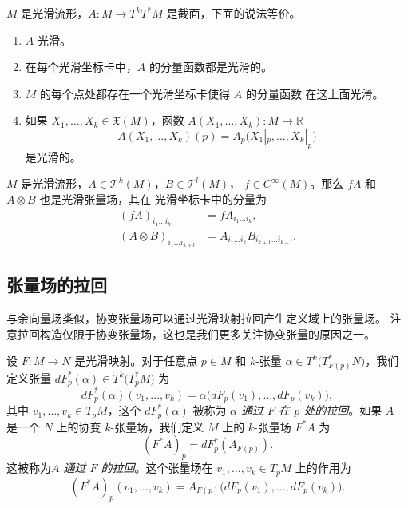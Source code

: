 \documentclass[fontset=none]{Notes}
\begin{document}
\begin{proposition}[张量场的光滑性判别]
  $M$ 是光滑流形，$A:M\to T^kT^*M$ 是截面，下面的说法等价。
  \begin{enumerate}
    \item $A$ 光滑。
    \item 在每个光滑坐标卡中，$A$ 的分量函数都是光滑的。
    \item $M$ 的每个点处都存在一个光滑坐标卡使得 $A$ 的分量函数
    在这上面光滑。
    \item 如果 $X_1,\dots,X_k\in \mathfrak{X}(M)$，函数 $A(X_1,\dots,X_k):M\to \mathbb{R}$
    \[
      A(X_1,\dots,X_k)(p)=A_p\bigl(X_1|_p,\dots,X_k|_p\bigr)
    \]
    是光滑的。
  \end{enumerate}
\end{proposition}

\begin{proposition}
  $M$ 是光滑流形，$A\in \mathcal{T}^k(M)$，$B\in \mathcal{T}^l(M)$，
  $f\in C^\infty(M)$。那么 $fA$ 和 $A\otimes B$ 也是光滑张量场，其在
  光滑坐标卡中的分量为
  \begin{align*}
    (fA)_{i_1\dots i_k}&= fA_{i_1\dots i_k},\\
    (A\otimes B)_{i_1\dots i_{k+l}}&=A_{i_1\dots i_k}B_{i_{k+1}\dots i_{k+l}}.
  \end{align*}
\end{proposition}

\subsection{张量场的拉回}

与余向量场类似，协变张量场可以通过光滑映射拉回产生定义域上的张量场。
注意拉回构造仅限于协变张量场，这也是我们更多关注协变张量的原因之一。

设 $F:M\to N$ 是光滑映射。对于任意点 $p\in M$ 和 $k$-张量
$\alpha\in T^k\bigl(T_{F(p)}^*N\bigr)$，我们定义张量
$dF_p^*(\alpha)\in T^k\bigl(T_p^*M\bigr)$ 为
\[
  dF_p^*(\alpha)(v_1,\dots,v_k)=\alpha\bigl(dF_p(v_1),\dots,dF_p(v_k)\bigr)  ,
\]
其中 $v_1,\dots,v_k\in T_pM$，这个 $dF_p^*(\alpha)$ 被称为
\emph{$\alpha$ 通过 $F$ 在 $p$ 处的拉回}。如果 $A$ 是一个
$N$ 上的协变 $k$-张量场，我们定义 $M$ 上的 $k$-张量场
$F^*A$ 为
\[
  (F^*A)  _p=dF_p^*(A_{F(p)}).
\]
这被称为\emph{$A$ 通过 $F$ 的拉回}。这个张量场在
$v_1,\dots,v_k\in T_pM$ 上的作用为
\[
  (F^*A)  _p(v_1,\dots,v_k)=A_{F(p)}\bigl(dF_p(v_1),\dots,dF_p(v_k)\bigr).
\]


 
\end{document}

